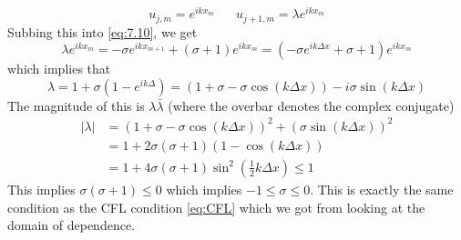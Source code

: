 \documentclass{article}
\newcommand{\twen}{\hspace{20pt}}
\numberwithin{equation}{section}
\begin{document}
\begin{equation*}
    u_{j,m}=e^{ikx_m} \twen u_{j+1,m}=\lambda e^{ikx_m}
\end{equation*}
Subbing this into \eqref{eq:7.10}, we get 
\begin{equation*}
    \lambda e^{ikx_m}=-\sigma e^{ikx_{m+1}} + (\sigma +1)e^{ikx_m}=(-\sigma e^{ik\Delta x}+\sigma +1)e^{ikx_m}
\end{equation*}
which implies that 
\begin{equation*}
    \lambda =1+\sigma(1-e^{ik\Delta }) = (1+\sigma -\sigma \cos(k\Delta x))-i\sigma \sin (k\Delta x)
\end{equation*}
The magnitude of this is $\lambda \bar\lambda$ (where the overbar denotes the complex conjugate) 
\begin{equation*}
    \begin{split}
        |\lambda|&=(1+\sigma-\sigma \cos(k\Delta x))^2+(\sigma \sin(k\Delta x))^2 \\&= 1+2\sigma(\sigma+1)(1-\cos(k\Delta x))\\&=1+4\sigma(\sigma +1)\sin^2\left(\tfrac{1}{2} k\Delta x\right) \leq 1
    \end{split}
\end{equation*}
This implies $\sigma(\sigma+1)\leq 0$ which implies $-1\leq \sigma \leq 0$. This is exactly the same condition as the CFL condition \eqref{eq:CFL} which we got from looking at the domain of dependence.
\end{document}
